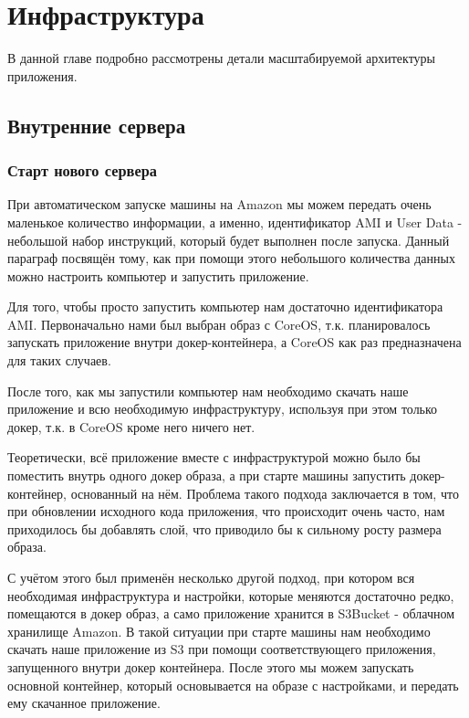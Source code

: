 
\chapter{Инфраструктура}

В данной главе подробно рассмотрены детали масштабируемой архитектуры приложения.

\section{Внутренние сервера}
\subsection{Старт нового сервера}
	При автоматическом запуске машины на Amazon мы можем передать очень маленькое количество информации, а именно, идентификатор AMI и User Data - небольшой набор инструкций, который будет выполнен после запуска. Данный параграф посвящён тому, как при помощи этого небольшого количества данных можно настроить компьютер и запустить приложение.
	
	Для того, чтобы просто запустить компьютер нам достаточно идентификатора AMI. Первоначально нами был выбран образ с CoreOS, т.к. планировалось запускать приложение внутри докер-контейнера, а CoreOS как раз предназначена для таких случаев.
	
	После того, как мы запустили компьютер нам необходимо скачать наше приложение и всю необходимую инфраструктуру, используя при этом только докер, т.к. в CoreOS кроме него ничего нет.
	
	Теоретически, всё приложение вместе с инфраструктурой можно было бы поместить внутрь одного докер образа, а при старте машины запустить докер-контейнер, основанный на нём. Проблема такого подхода заключается в том, что при обновлении исходного кода приложения, что происходит очень часто, нам приходилось бы добавлять слой, что приводило бы к сильному росту размера образа.
	
	С учётом этого был применён несколько другой подход, при котором вся необходимая инфраструктура и настройки, которые меняются достаточно редко, помещаются в докер образ, а само приложение хранится в S3Bucket - облачном хранилище Amazon. В такой ситуации при старте машины нам необходимо  скачать наше приложение из S3 при помощи соответствующего приложения, запущенного внутри докер контейнера. После этого мы можем запускать основной контейнер, который основывается на образе с настройками, и передать ему скачанное приложение.
	
